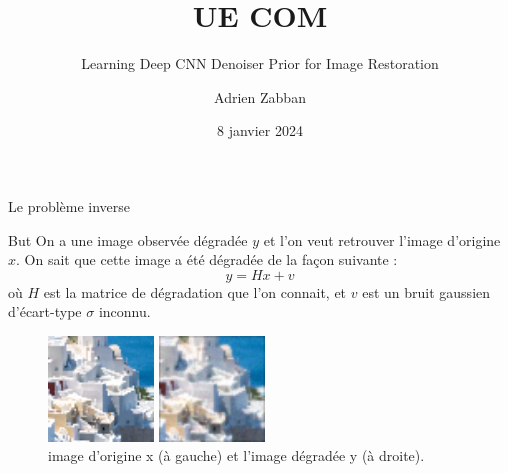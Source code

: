 \documentclass[11pt]{beamer}
\title{UE COM}
\subtitle{Learning Deep CNN Denoiser Prior for Image Restoration}
\author{Adrien Zabban}
\date{8 janvier 2024}
\begin{document}
\maketitle

\begin{frame}{Le problème inverse}
    \begin{block}{But}
        On a une image observée dégradée $y$ et l'on veut retrouver l'image d'origine $x$. On sait 
        que cette image a été dégradée de la façon suivante : 
        $$y = Hx + v$$
        où $H$ est la matrice de 
        dégradation que l'on connait, et $v$ est un bruit gaussien d'écart-type $\sigma$ inconnu.
    \end{block}
    \begin{figure}[b]
        \centering
        \includegraphics[width=0.25\textwidth]{../images/hqs_original/0823.png}
        \hspace{1cm}
        \includegraphics[width=0.25\textwidth]{../images/hqs_constant/y.png}
        \caption{image d'origine x (à gauche) et l'image dégradée y (à droite).}
    \end{figure}
\end{frame}
\end{document}
